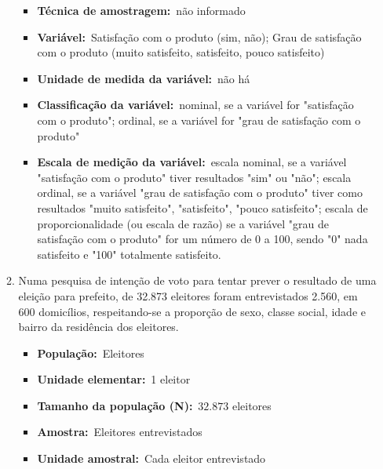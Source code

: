 \begin{enumerate}[label=\emph{\arabic*})]
\begin{enumerate}[label=\emph{\alph*})]
\begin{itemize}
			            \item \textbf{Técnica de amostragem:}~não informado

			            \item \textbf{Variável:}~Satisfação com o produto (sim, não); Grau de satisfação com o produto (muito satisfeito,
			                  satisfeito, pouco satisfeito)

			            \item \textbf{Unidade de medida da variável:}~não há

			            \item \textbf{Classificação da variável:}~nominal, se a variável for "satisfação com o produto"; ordinal, se a variável
			                  for "grau de satisfação com o produto"

			            \item \textbf{Escala de medição da variável:}~escala nominal, se a variável "satisfação com o produto" tiver resultados
			                  "sim" ou "não"; escala ordinal, se a variável "grau de satisfação com o produto" tiver como resultados
			                  "muito satisfeito", "satisfeito", "pouco satisfeito"; escala de proporcionalidade (ou escala de razão) se a
			                  variável "grau de satisfação com o produto" for um número de 0 a 100, sendo "0" nada satisfeito e "100"
			                  totalmente satisfeito.
		            \end{itemize}

		      \item Numa pesquisa de intenção de voto para tentar prever o resultado de uma eleição para
		            prefeito, de 32.873 eleitores foram entrevistados 2.560, em 600 domicílios, respeitando-se a proporção de sexo, classe social, idade e bairro da residência dos eleitores.

		            \begin{itemize}
			            \item \textbf{População:}~Eleitores

			            \item \textbf{Unidade elementar:}~1 eleitor

			            \item \textbf{Tamanho da população (N):}~$32.873$ eleitores

			            \item \textbf{Amostra:}~Eleitores entrevistados

			            \item \textbf{Unidade amostral:}~Cada eleitor entrevistado


\end{itemize}
\end{enumerate}
\end{enumerate}
